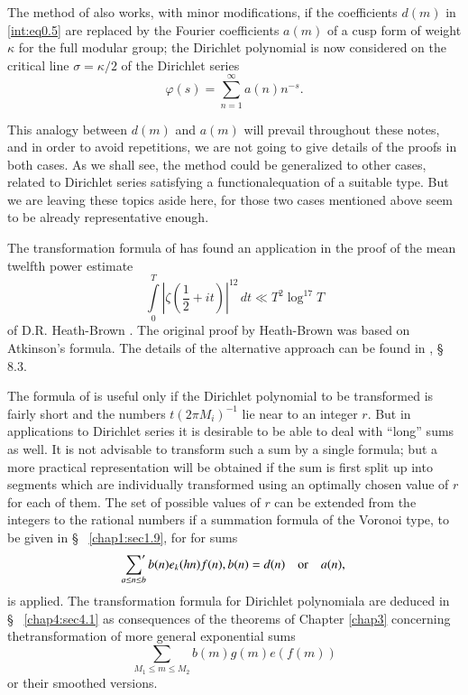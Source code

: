 The method of \cite{key16} also works, with minor modifications, if
the coefficients $d(m)$ in \eqref{int:eq0.5} are replaced by the
Fourier coefficients $a(m)$ of a cusp form of weight $\kappa$ for the
full modular group; the Dirichlet polynomial is now considered on the
critical line $\sigma =\kappa/2$ of the Dirichlet series
$$
\varphi(s)=\sum\limits_{n=1}^\infty a(n)n^{-s}.
$$

This analogy between $d(m)$ and $a(m)$ will prevail
throughout these notes, and in order to avoid repetitions, we are not
going to give details of the proofs in both cases. As we shall see,
the method could be generalized to other cases, related to Dirichlet
series satisfying a functional\pageoriginale equation of a suitable
type. But we are leaving these topics aside here, for those two cases
mentioned above seem to be already representative enough. 

The transformation formula of \cite{key16} has found an application
in the proof of the mean twelfth power estimate 
\begin{equation}
\int\limits_0^T|\zeta\left(\frac{1}{2}+it\right)|^{12}\,dt\ll
T^2\log^{17}T\tag{0.7}\label{int:eq0.7} 
\end{equation}
of D.R. Heath-Brown \cite{key11}. The original proof by Heath-Brown
was based on Atkinson's formula. The details of the alternative
approach can be found in \cite{key13}, \S ~ 8.3.

The formula of \cite{key16} is useful only if the Dirichlet polynomial
to be transformed is fairly short and the numbers $t(2\pi M_i)^{-1}$
lie near to an integer $r$. But in applications to Dirichlet series it
is desirable to be able to deal with ``long'' sums as well. It is not
advisable to transform such a sum by a single formula; but a more
practical representation will be obtained if the sum is first split up
into segments which are individually transformed using an optimally
chosen value of $r$ for each of them. The set of possible values of
$r$ can be extended from the integers to the rational numbers if a
summation formula of the Voronoi type, to be given in \S~
\ref{chap1:sec1.9}, for for sums
$$
\sideset{}{'}\sum\limits_{a\leq n\leq b} b(n)e_k(hn)f(n),b(n)=d(n)
\quad\text{or}\quad a(n),
$$
is applied. The transformation formula for Dirichlet polynomiala are
deduced in \S~ \ref{chap4:sec4.1} as consequences of the theorems of
Chapter \ref{chap3} concerning the\pageoriginale transformation of
more general exponential sums 
\begin{equation}
\sum\limits_{M_1\leq m\leq M_2}b(m)g(m)e(f(m))\tag{0.8}\label{int:eq0.8}
\end{equation}
or their smoothed versions.


